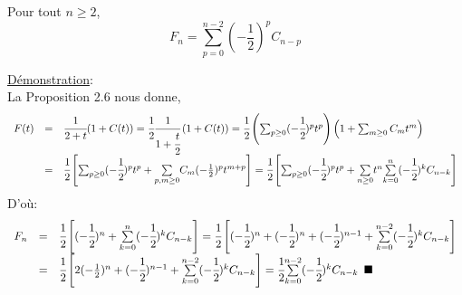 		\begin{corollaire}
			Pour tout $n\geq 2$,\[ F_{n}=\sum_{p=0}^{n-2}(-\frac{1}{2})^p C_{n-p}\]
		\end{corollaire}
		\underline{Démonstration}:\\
		La Proposition 2.6 nous donne,
		\[
		\begin{array}{c c l}
		F(t)&=&\cfrac{1}{2+t}(1+C(t))=\cfrac{1}{2}\cfrac{1}{1+\cfrac{t}{2}}\left(1+C(t)\right)
		=\cfrac{1}{2}\left(\sum_{p\geq 0}(-\cfrac{1}{2})^p t^p\right)\left(1+\sum_{m\geq 0}C_{m}t^m\right)\\
		&=&\cfrac{1}{2}\left[\sum_{p\geq 0}(-\cfrac{1}{2})^p t^p + \underset{p,m\geq0}{\sum}C_{m}(-\frac{1}{2})^p t^{m+p}\right]=\cfrac{1}{2}\left[\sum_{p\geq 0}(-\cfrac{1}{2})^p t^p +\underset{n\geq0}{\sum}t^n\underset{k=0}{\overset{n}{\sum}}(-\cfrac{1}{2})^k C_{n-k}\right]
		\end{array}
		\]
		D'où:
		\[
		\begin{array}{c c l}
		F_{n}&=&\cfrac{1}{2}\left[(-\cfrac{1}{2})^n + \underset{k=0}{\overset{n}{\sum}}(-\cfrac{1}{2})^k C_{n-k}\right]=\cfrac{1}{2}\left[(-\cfrac{1}{2})^n + (-\cfrac{1}{2})^n +(-\cfrac{1}{2})^{n-1} +\underset{k=0}{\overset{n-2}{\sum}}(-\cfrac{1}{2})^k C_{n-k}\right]\\
		&=&\cfrac{1}{2}\left[2(-\frac{1}{2})^n + (-\cfrac{1}{2})^{n-1} +\underset{k=0}{\overset{n-2}{\sum}}(-\cfrac{1}{2})^k C_{n-k}\right]=\cfrac{1}{2}\underset{k=0}{\overset{n-2}{\sum}}(-\cfrac{1}{2})^k C_{n-k}\hspace{5pt}\blacksquare
		\end{array}
		\]
